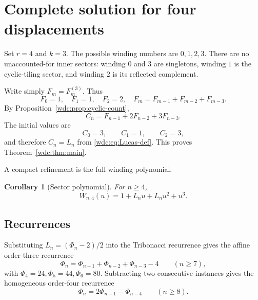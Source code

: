 \documentclass[11pt,letterpaper]{article}
\numberwithin{equation}{section}
\newtheorem{corollary}[theorem]{Corollary}
\theoremstyle{definition}
\begin{document}
\section{Complete solution for four displacements}\label{wdc:sec:specialization}

Set $r=4$ and $k=3$.  The possible winding numbers are $0,1,2,3$.  There are no
unaccounted-for inner sectors: winding $0$ and $3$ are singletons, winding $1$
is the cyclic-tiling sector, and winding $2$ is its reflected complement.

Write simply $F_m=F_m^{(3)}$.  Thus
\begin{equation}\label{wdc:eq:F-initial}
  F_0=1,\quad F_1=1,\quad F_2=2,\quad
  F_m=F_{m-1}+F_{m-2}+F_{m-3}.
\end{equation}
By Proposition~\ref{wdc:prop:cyclic-count},
\begin{equation}\label{wdc:eq:C123}
  C_n=F_{n-1}+2F_{n-2}+3F_{n-3}.
\end{equation}
The initial values are
\[
  C_0=3,\qquad C_1=1,\qquad C_2=3,
\]
and therefore $C_n=L_n$ from \eqref{wdc:eq:Lucas-def}.  This proves
Theorem~\ref{wdc:thm:main}.

A compact refinement is the full winding polynomial.

\begin{corollary}[Sector polynomial]\label{wdc:cor:sector-poly-r4}
For $n\ge4$,
\begin{equation}\label{wdc:eq:sector-poly-r4}
  W_{n,4}(u)=1+L_nu+L_nu^2+u^3.
\end{equation}
\end{corollary}

\subsection{Recurrences}

Substituting $L_n=(\Phi_n-2)/2$ into the Tribonacci recurrence gives the affine
order-three recurrence
\begin{equation}\label{wdc:eq:true-affine-recurrence}
  \boxed{\Phi_n=\Phi_{n-1}+\Phi_{n-2}+\Phi_{n-3}-4}
  \qquad(n\ge7),
\end{equation}
with $\Phi_4=24,\Phi_5=44,\Phi_6=80$.  Subtracting two consecutive instances
gives the homogeneous order-four recurrence
\begin{equation}\label{wdc:eq:true-homogeneous-recurrence}
  \boxed{\Phi_n=2\Phi_{n-1}-\Phi_{n-4}}
  \qquad(n\ge8).
\end{equation}
\end{document}
